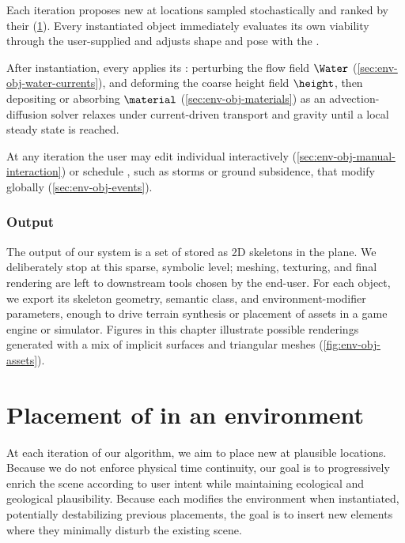 Each iteration proposes new  at locations sampled stochastically and ranked by their  (\cref{sec:env-obj-generation-rules}).  
Every instantiated object immediately evaluates its own viability through the user-supplied  and adjusts shape and pose with the .

After instantiation, every  applies its : perturbing the flow field $\Water$ (\cref{sec:env-obj-water-currents}), and deforming the coarse height field $\height$, then depositing or absorbing  $\material$ (\cref{sec:env-obj-materials}) as an advection-diffusion solver relaxes  under current-driven transport and gravity until a local steady state is reached.

At any iteration the user may edit individual  interactively (\cref{sec:env-obj-manual-interaction}) or schedule , such as storms or ground subsidence, that modify  globally (\cref{sec:env-obj-events}).

\subsubsection{Output}
The output of our system is a set of  stored as 2D skeletons in the plane. We deliberately stop at this sparse, symbolic level; meshing, texturing, and final rendering are left to downstream tools chosen by the end-user. For each object, we export its skeleton geometry, semantic class, and environment-modifier parameters, enough to drive terrain synthesis or placement of assets in a game engine or simulator. Figures in this chapter illustrate possible renderings generated with a mix of implicit surfaces and triangular meshes (\cref{fig:env-obj-assets}).



\section{Placement of  in an environment}
\label{sec:env-obj-generation-rules}
At each iteration of our algorithm, we aim to place new  at plausible locations. Because we do not enforce physical time continuity, our goal is to progressively enrich the scene according to user intent while maintaining ecological and geological plausibility.
Because each  modifies the environment when instantiated, potentially destabilizing previous placements, the goal is to insert new elements where they minimally disturb the existing scene.

